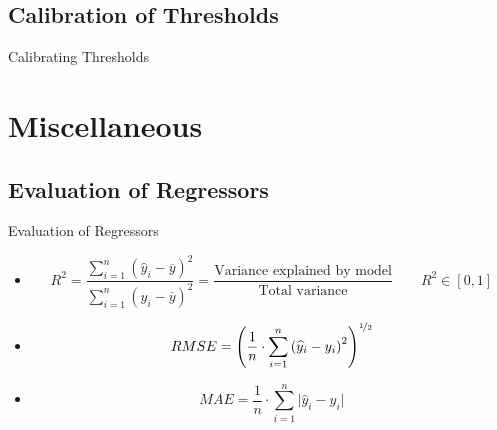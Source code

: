 \subsection{Calibration of Thresholds}

\begin{frame}{Calibrating Thresholds}{}
\end{frame}


\section{Miscellaneous}

\subsection{Evaluation of Regressors}

\begin{frame}{Evaluation of Regressors}{}
	\begin{itemize}
		\item {}
		\scriptsize
		\begin{equation}
			R^2 	= \frac{\sum_{i=1}^n (\widehat{y}_i - \overline{y})^2}{\sum_{i=1}^n (y_i - \overline{y})^2}
					= \frac{\text{Variance explained by model}}{\text{Total variance}} \qquad R^2 \in [0,1]
		\end{equation}
		\normalsize
		\item {}
		\scriptsize
		\begin{equation}
			RMSE = \left( \frac{1}{n} \cdot \sum_{i=1}^n \left( \widehat{y}_i - y_i \right)^2 \right)^{\nicefrac{1}{2}}
		\end{equation}
		\normalsize
		\item {}
		\scriptsize
		\begin{equation}
			MAE = \frac{1}{n} \cdot \sum_{i=1}^n \vert \widehat{y}_i - y_i \vert
		\end{equation}
	\end{itemize}
\end{frame}


